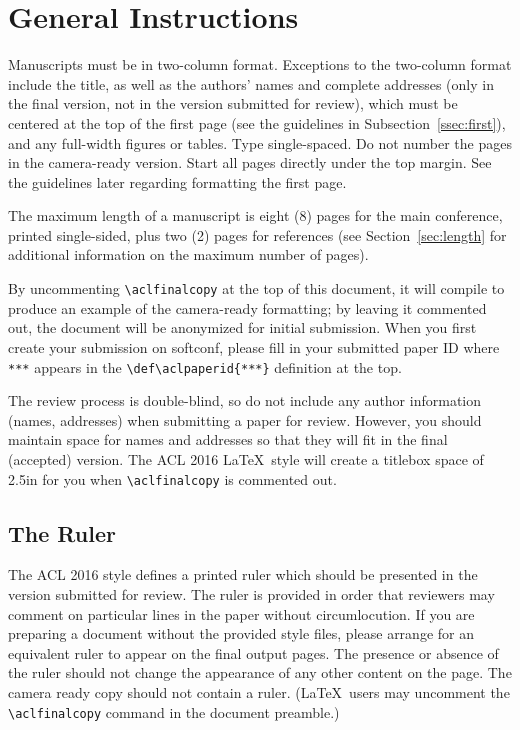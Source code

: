 \documentclass[11pt]{article}
\begin{document}
\section{General Instructions}

Manuscripts must be in two-column format.  Exceptions to the
two-column format include the title, as well as the 
authors' names and complete
addresses (only in the final version, not in the version submitted for review), 
which must be centered at the top of the first page (see
the guidelines in Subsection~\ref{ssec:first}), and any full-width
figures or tables.  Type single-spaced.  Do not number the pages 
in the camera-ready version.
Start all pages directly under the top margin.  See the guidelines
later regarding formatting the first page.

The maximum length of a manuscript is eight (8) pages for the main
conference, printed single-sided, plus two (2) pages for references
(see Section~\ref{sec:length} for additional information on the
maximum number of pages). 

By uncommenting {\small\verb|\aclfinalcopy|} at the top of this 
 document, it will compile to produce an example of the camera-ready formatting; by leaving it commented out, the document will be anonymized for initial submission.  When you first create your submission on softconf, please fill in your submitted paper ID where {\small\verb|***|} appears in the {\small\verb|\def\aclpaperid{***}|} definition at the top.

The review process is double-blind, so do not include any author information (names, addresses) when submitting a paper for review.  
However, you should maintain space for names and addresses so that they will fit in the final (accepted) version.  The ACL 2016 \LaTeX\ style will create a titlebox space of 2.5in for you when {\small\verb|\aclfinalcopy|} is commented out.  

\subsection{The Ruler}
The ACL 2016 style defines a printed ruler which should be presented in the
version submitted for review.  The ruler is provided in order that
reviewers may comment on particular lines in the paper without
circumlocution.  If you are preparing a document without the provided
style files, please arrange for an equivalent ruler to
appear on the final output pages.  The presence or absence of the ruler
should not change the appearance of any other content on the page.  The
camera ready copy should not contain a ruler. (\LaTeX\ users may uncomment
the {\small\verb|\aclfinalcopy|} command in the document preamble.)  
\end{document}
